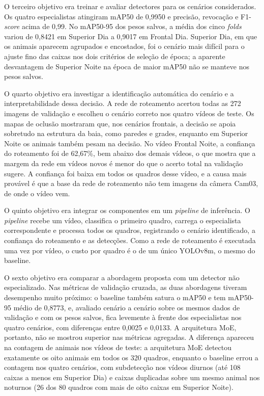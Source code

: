 O terceiro objetivo era treinar e avaliar detectores para os cenários considerados. Os quatro especialistas atingiram mAP50 de 0,9950 e precisão, revocação e F1-\textit{score} acima de 0,99. No mAP50-95 dos pesos salvos, a média dos cinco \textit{folds} variou de 0,8421 em Superior Dia a 0,9017 em Frontal Dia. Superior Dia, em que os animais aparecem agrupados e encostados, foi o cenário mais difícil para o ajuste fino das caixas nos dois critérios de seleção de época; a aparente desvantagem de Superior Noite na época de maior mAP50 não se manteve nos pesos salvos.

O quarto objetivo era investigar a identificação automática do cenário e a interpretabilidade dessa decisão. A rede de roteamento acertou todas as 272 imagens de validação e escolheu o cenário correto nos quatro vídeos de teste. Os mapas de oclusão mostraram que, nos cenários frontais, a decisão se apoia sobretudo na estrutura da baia, como paredes e grades, enquanto em Superior Noite os animais também pesam na decisão. No vídeo Frontal Noite, a confiança do roteamento foi de 62,67\%, bem abaixo dos demais vídeos, o que mostra que a margem da rede em vídeos novos é menor do que o acerto total na validação sugere. A confiança foi baixa em todos os quadros desse vídeo, e a causa mais provável é que a base da rede de roteamento não tem imagens da câmera Cam03, de onde o vídeo vem.

O quinto objetivo era integrar os componentes em um \textit{pipeline} de inferência. O \textit{pipeline} recebe um vídeo, classifica o primeiro quadro, carrega o especialista correspondente e processa todos os quadros, registrando o cenário identificado, a confiança do roteamento e as detecções. Como a rede de roteamento é executada uma vez por vídeo, o custo por quadro é o de um único YOLOv8m, o mesmo do baseline.

O sexto objetivo era comparar a abordagem proposta com um detector não especializado. Nas métricas de validação cruzada, as duas abordagens tiveram desempenho muito próximo: o baseline também satura o mAP50 e tem mAP50-95 médio de 0,8773, e, avaliado cenário a cenário sobre os mesmos dados de validação e com os pesos salvos, fica levemente à frente dos especialistas nos quatro cenários, com diferenças entre 0,0025 e 0,0133. A arquitetura MoE, portanto, não se mostrou superior nas métricas agregadas. A diferença apareceu na contagem de animais nos vídeos de teste: a arquitetura MoE detectou exatamente os oito animais em todos os 320 quadros, enquanto o baseline errou a contagem nos quatro cenários, com subdetecção nos vídeos diurnos (até 108 caixas a menos em Superior Dia) e caixas duplicadas sobre um mesmo animal nos noturnos (26 dos 80 quadros com mais de oito caixas em Superior Noite).

